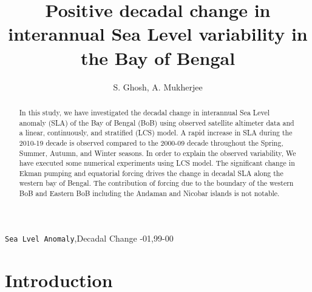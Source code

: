 \documentclass[review]{elsarticle}
\begin{document}
\begin{frontmatter}

\title{Positive decadal change in interannual Sea Level variability in the Bay of Bengal}

\author{S. Ghosh, A. Mukherjee}




\begin{abstract}
In this study, we have investigated the decadal change in interannual Sea Level anomaly (SLA) of the Bay of Bengal (BoB) using observed satellite altimeter data and a linear, continuously, and stratified (LCS) model. A rapid increase in SLA during the 2010-19 decade is observed compared to the 2000-09 decade throughout the Spring, Summer, Autumn, and Winter seasons. In order to explain the observed variability, We have executed some numerical experiments using LCS model. The significant change in Ekman pumping and equatorial forcing drives the change in decadal SLA along the western bay of Bengal. The contribution of forcing due to the boundary of the western BoB and Eastern BoB including the Andaman and Nicobar islands is not notable. 
\end{abstract}

\begin{keyword}
\texttt{Sea Lvel Anomaly}\sep Decadal Change 
-01\sep  99-00
\end{keyword}

\end{frontmatter}

\linenumbers

\section{Introduction}
\end{document}
